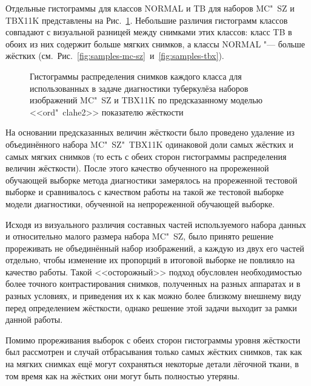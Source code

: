 Отдельные гистограммы для классов NORMAL и TB для наборов MC"~SZ и TBX11K представлены на Рис.~\ref{fig:ordinal-hist-datasetwise}. Небольшие различия гистограмм классов совпадают с визуальной разницей между снимками этих классов: класс TB в обоих из них содержит больше мягких снимков, а классы NORMAL "--- больше жёстких (см.~Рис.~\ref{fig:samples-mc-sz}~и~\ref{fig:samples-tbx}).

\begin{figure}[ht]
	\caption{Гистограммы распределения снимков каждого класса для использованных в задаче диагностики туберкулёза наборов изображений MC"~SZ и TBX11K по предсказанному моделью <<ord"~clahe2>> показателю жёсткости}
	\label{fig:ordinal-hist-datasetwise}
\end{figure}

На основании предсказанных величин жёсткости было проведено удаление из объединённого набора MC"~SZ"~TBX11K одинаковой доли самых жёстких и самых мягких снимков (то есть с обеих сторон гистограммы распределения величин жёсткости). После этого качество обученного на прореженной обучающей выборке метода диагностики замерялось на прореженной тестовой выборке и сравнивалось с качеством работы на такой же тестовой выборке модели диагностики, обученной на непрореженной обучающей выборке.

Исходя из визуального различия составных частей используемого набора данных и относительно малого размера набора MC"~SZ, было принято решение прореживать не объединённый набор изображений, а каждую из двух его частей отдельно, чтобы изменение их пропорций в итоговой выборке не повлияло на качество работы. Такой <<осторожный>> подход обусловлен необходимостью более точного контрастирования снимков, полученных на разных аппаратах и в разных условиях, и приведения их к как можно более близкому внешнему виду перед определением жёсткости, однако решение этой задачи выходит за рамки данной работы.

Помимо прореживания выборок с обеих сторон гистограммы уровня жёсткости был рассмотрен и случай отбрасывания только самых жёстких снимков, так как на мягких снимках ещё могут сохраняться некоторые детали лёгочной ткани, в том время как на жёстких они могут быть полностью утеряны.

